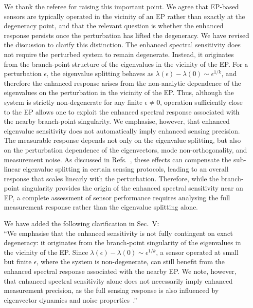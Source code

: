 \documentclass[aps,prb,onecolumn,nofootinbib,citeautoscript,10pt]{revtex4-2}
\begin{document}
\begin{enumerate}
We thank the referee for raising this important point. We agree that EP-based sensors are typically operated in the vicinity of an EP rather than exactly at the degeneracy point, and that the relevant question is whether the enhanced response persists once the perturbation has lifted the degeneracy. We have revised the discussion to clarify this distinction.
The enhanced spectral sensitivity does not require the perturbed system to remain degenerate. Instead, it originates from the branch-point structure of the eigenvalues in the vicinity of the EP. For a perturbation $\epsilon$, the eigenvalue splitting behaves as $\lambda(\epsilon)-\lambda(0)\sim\epsilon^{1/k}$, and therefore the enhanced response arises from the non-analytic dependence of the eigenvalues on the perturbation in the vicinity of the EP. Thus, although the system is strictly non-degenerate for any finite $\epsilon\neq0$, operation sufficiently close to the EP allows one to exploit the enhanced spectral response associated with the nearby branch-point singularity.
We emphasise, however, that enhanced eigenvalue sensitivity does not automatically imply enhanced sensing precision. The measurable response depends not only on the eigenvalue splitting, but also on the perturbation dependence of the eigenvectors, mode non-orthogonality, and measurement noise. As discussed in Refs.~\cite{Langbein,emil-budich}, these effects can compensate the sub-linear eigenvalue splitting in certain sensing protocols, leading to an overall response that scales linearly with the perturbation. Therefore, while the branch-point singularity provides the origin of the enhanced spectral sensitivity near an EP, a complete assessment of sensor performance requires analysing the full measurement response rather than the eigenvalue splitting alone.

We have added the following clarification in Sec.~V:
\\``We emphasise that the enhanced sensitivity is not fully contingent on exact degeneracy: it originates from the branch-point singularity of the eigenvalues in the vicinity of the EP. Since $\lambda(\epsilon)-\lambda(0)\sim\epsilon^{1/k}$, a sensor operated at small but finite $\epsilon$, where the system is non-degenerate, can still benefit from the enhanced spectral response associated with the nearby EP. We note, however, that enhanced spectral sensitivity alone does not necessarily imply enhanced measurement precision, as the full sensing response is also influenced by eigenvector dynamics and noise properties~\cite{Langbein,emil-budich}.''



\end{enumerate}
\end{document}
